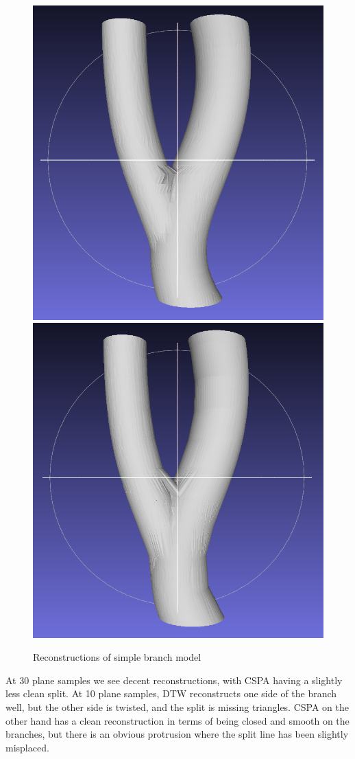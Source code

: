 \documentclass[11p, titlepage]{article}
\begin{document}
\begin{figure}[h]
\begin{minipage}[b]{.6\linewidth}
       \hfill
       {\includegraphics[width=.48\linewidth]{reconstructions/cspa50-simple-branch-30}}%
       \hfill
       {\includegraphics[width=.48\linewidth]{reconstructions/cspa50-simple-branch-10}}
     \end{minipage}%
        \caption{Reconstructions of simple branch model}
        \label{fig:simple_branch_reconstructions}
\end{figure}

At 30 plane samples we see decent reconstructions, with CSPA having a slightly less clean split. At 10 plane samples, DTW reconstructs one side of the branch well, but the other side is twisted, and the split is missing triangles. CSPA on the other hand has a clean reconstruction in terms of being closed and smooth on the branches, but there is an obvious protrusion where the split line has been slightly misplaced. 
\end{document}
